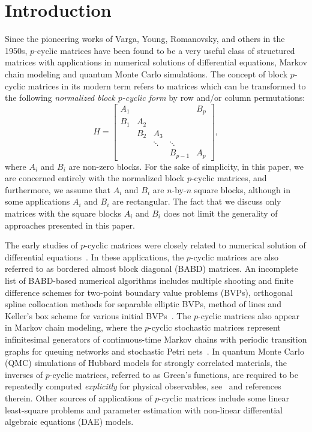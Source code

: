 \documentclass{llncs}
\begin{document}
\section{Introduction}

Since the pioneering works of
Varga, Young, Romanovsky, and others in the 1950s,
$p$-cyclic matrices
have been found to be a very useful class of structured matrices
with applications in numerical solutions of differential equations, 
Markov chain modeling and quantum Monte Carlo simulations. 
The concept of block $p$-cyclic matrices
in its modern term refers to matrices which can be
transformed to the following \emph{normalized block $p$-cyclic form} 
by row and/or column permutations: 
\begin{equation} \label{eq:matr_A}
  H =
  \begin{bmatrix}
    A_1 &    &    &  & B_p   \\
    B_1 & A_2 &    &  &  \\
    & B_2 & A_3 &  &     \\
    &        & \ddots & \ddots &         \\
    &     &          & B_{p-1} & A_p
  \end{bmatrix}
  ,
\end{equation}
where $A_i$ and $B_i$ are non-zero blocks.
For the sake of simplicity, in this paper,
we are concerned entirely with the {normalized block $p$-cyclic matrices},
and furthermore, we assume that 
$A_i$ and $B_i$ are $n$-by-$n$ square blocks, although
in some applications $A_i$ and $B_i$ are rectangular.
The fact that we discuss only matrices with the square blocks $A_i$ and $B_i$
does not limit the generality of approaches presented in this paper.

The early studies of $p$-cyclic matrices 
were closely related to numerical solution of differential 
equations~\cite{Wright93,Wright92BSOF,Fairweather04}.
In these applications, the $p$-cyclic matrices are also 
referred to as bordered almost block diagonal 
(BABD) matrices.  An incomplete list of 
BABD-based numerical algorithms includes multiple shooting 
and finite difference schemes for two-point boundary value problems (BVPs),
orthogonal spline collocation methods for separable elliptic BVPs, 
method of lines and Keller's box scheme for various initial 
BVPs~\cite{Wright92BSOF,Fairweather04}.
%
The $p$-cyclic matrices also appear in 
Markov chain modeling, where the $p$-cyclic stochastic 
matrices represent infinitesimal generators of continuous-time 
Markov chains with periodic transition graphs for queuing networks 
and stochastic Petri nets~\cite{Ernst00}.
%
In quantum Monte Carlo (QMC) simulations of Hubbard models for
strongly correlated materials,
the inverses of $p$-cyclic matrices, referred to as Green's functions, 
are required to be repeatedly computed {\em explicitly} for 
physical observables, see~\cite{Bai09,Tomas12} and references therein.
Other sources of applications of $p$-cyclic matrices include
some linear least-square problems and parameter estimation with 
non-linear differential algebraic equations (DAE) models.
\end{document}
